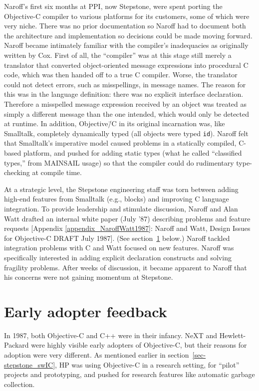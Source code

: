 \documentclass[acmsmall]{acmart}\settopmatter{}
\begin{document}
Naroff's first six months at PPI, now Stepstone, were spent porting the Objective-C compiler to various platforms for its customers, some of which were very niche. There was no prior documentation so Naroff had to document both the architecture and implementation so decisions could be made moving forward. Naroff became intimately familiar with the compiler's inadequacies as originally written by Cox. First of all, the ``compiler'' was at this stage still merely a translator that converted object-oriented message expressions into procedural C code, which was then handed off to a true C compiler. Worse, the translator could not detect errors, such as misspellings, in message names. The reason for this was in the language definition: there was no explicit interface declaration. Therefore a misspelled message expression received by an object was treated as simply a different message than the one intended, which would only be detected at runtime. In addition, Objective\=/C in its original incarnation was, like Smalltalk, completely dynamically typed (all objects were typed \verb$id$). Naroff felt that Smalltalk's imperative model caused problems in a statically compiled, C-based platform, and pushed for adding static types (what he called ``classified types,'' from MAINSAIL usage) so that the compiler could do rudimentary type-checking at compile time.

At a strategic level, the Stepstone engineering staff was torn between adding high-end features from Smalltalk (e.g., blocks) and improving C language integration. To provide leadership and stimulate discussion, Naroff and Alan Watt drafted an internal white paper (July '87) describing problems and feature requests [Appendix \ref{appendix_NaroffWatt1987}: Naroff and Watt, Design Issues for Objective-C DRAFT July 1987]. (See section~\ref{sec-earlyadopterfeedback} below.) Naroff tackled integration problems with C and Watt focused on new features. Naroff was specifically interested in adding explicit declaration constructs and solving fragility problems. After weeks of discussion, it became apparent to Naroff that his concerns were not gaining momentum at Stepstone. 
\section{Early adopter feedback}
\label{sec-earlyadopterfeedback}
In 1987, both Objective-C and C++ were in their infancy. NeXT and Hewlett-Packard were highly visible early adopters of Objective-C, but their reasons for adoption were very different. As mentioned earlier in section~\ref{sec-stepstone_swIC}, HP was using Objective-C in a research setting, for ``pilot'' projects and prototyping, and pushed for research features like automatic garbage collection.
\end{document}
